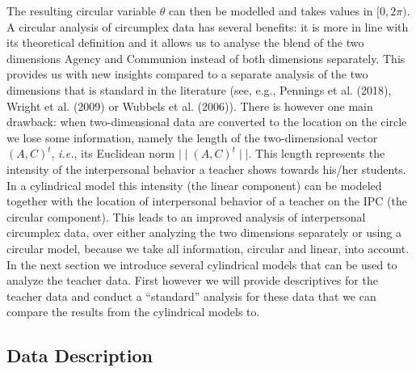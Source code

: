 \documentclass[man,mask]{apa6}
\begin{document}
The resulting circular variable \(\theta\) can then be modelled and takes values
in \([0, 2\pi)\).\newline
\indent A circular analysis of circumplex data has several benefits: it is more
in line with its theoretical definition and it allows us to analyse the blend of
the two dimensions Agency and Communion instead of both dimensions separately.
This provides us with new insights compared to a separate analysis of the two
dimensions that is standard in the literature (see, e.g.,
Pennings et al. (2018), Wright et al. (2009) or
Wubbels et al. (2006)). There is however one main drawback: when
two-dimensional data are converted to the location on the circle we lose some
information, namely the length of the two-dimensional vector \((A, C)^t\),
\emph{i.e.}, its Euclidean norm \(\mid\mid (A, C)^t \mid\mid\). This length
represents the intensity of the interpersonal behavior a teacher shows towards
his/her students. In a cylindrical model this intensity (the linear component)
can be modeled together with the location of interpersonal behavior of a teacher
on the IPC (the circular component). This leads to an improved analysis of
interpersonal circumplex data, over either analyzing the two dimensions
separately or using a circular model, because we take all information, circular
and linear, into account. In the next section we introduce several cylindrical
models that can be used to analyze the teacher data. First however we will
provide descriptives for the teacher data and conduct a \enquote{standard} analysis for
these data that we can compare the results from the cylindrical models to.

\subsection{Data Description}\label{DataDescriptives}
\end{document}
